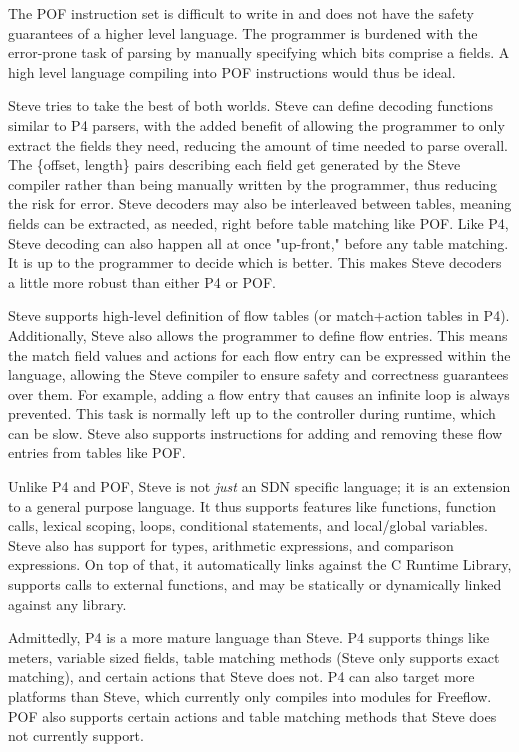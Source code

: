 The POF instruction set is difficult to write in and does not have the safety
guarantees of a higher level language. The programmer is burdened with the
error-prone task of parsing by manually specifying which bits comprise a fields. 
A high level language compiling into POF instructions would thus be ideal.

Steve tries to take the best of both worlds. Steve can define decoding functions
similar to P4 parsers, with the added benefit of allowing the programmer to only
extract the fields they need, reducing the amount of time needed to parse
overall. The \{offset, length\} pairs describing each field get generated by the
Steve compiler rather than being manually written by the programmer, thus
reducing
the risk for error. Steve decoders may also be interleaved between tables,
meaning fields can be extracted, as needed, right before table matching like
POF. Like P4,
Steve decoding can also happen all at once "up-front," before any table
matching. 
It is up to the programmer to decide which is better. This makes Steve
decoders a little more robust than either P4 or POF. 

Steve supports high-level definition of flow tables (or match+action tables in
P4). Additionally, Steve also allows the programmer to define flow entries. This
means the match field values and actions for each flow entry can be expressed
within the language, allowing the Steve compiler to ensure safety and
correctness guarantees over them. For example, adding a flow entry that causes
an infinite loop is always prevented. This task is normally left up to the
controller during runtime, which can be slow. Steve also supports instructions
for adding and removing these flow entries from tables like POF.

Unlike P4 and POF, Steve is not \textit{just} an SDN specific language; it is an
extension to a general purpose language. It thus supports features like
functions, function calls, lexical scoping, loops, conditional statements, and
local/global variables. Steve also has support for types, arithmetic
expressions, and comparison expressions. On top of that, it automatically links
against the C Runtime Library, supports calls to external functions, and may be
statically or dynamically linked against any library.

Admittedly, P4 is a more mature language than Steve. P4 supports things like
meters, variable sized fields, table matching methods (Steve only supports exact
matching), and certain actions that Steve does not. P4 can also target more
platforms than Steve, which currently only compiles into modules for Freeflow.
POF also supports certain actions and table matching methods that Steve does not
currently support.

